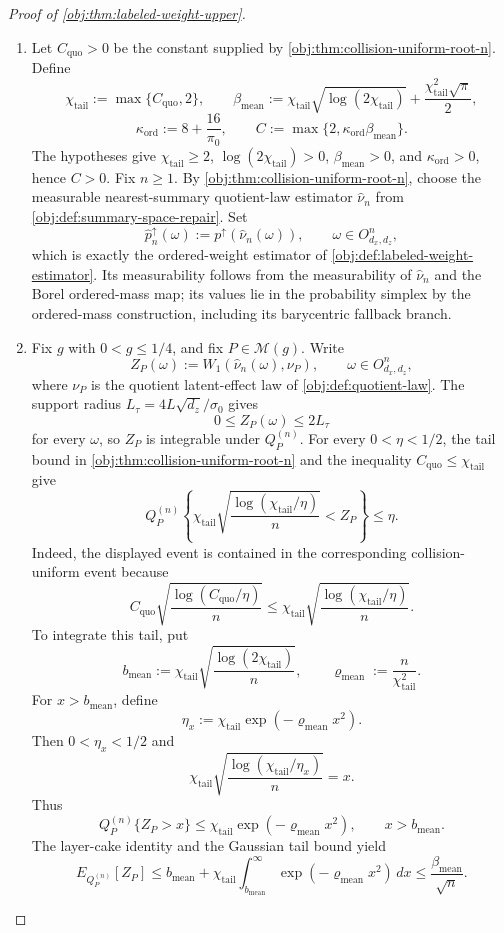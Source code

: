 \documentclass[11pt]{article}
\begin{document}
\begin{proof}[Proof of \cref{obj:thm:labeled-weight-upper}]
\begin{enumerate}
\item
Let \(C_{\mathrm{quo}}>0\) be the constant supplied by \cref{obj:thm:collision-uniform-root-n}.  Define
\[
\chi_{\mathrm{tail}}:=\max\{C_{\mathrm{quo}},2\},\qquad
\beta_{\mathrm{mean}}
:=\chi_{\mathrm{tail}}\sqrt{\log(2\chi_{\mathrm{tail}})}
+\frac{\chi_{\mathrm{tail}}^2\sqrt{\pi}}{2},
\]
\[
\kappa_{\mathrm{ord}}:=8+\frac{16}{\pi_0},
\qquad
C:=\max\{2,\kappa_{\mathrm{ord}}\beta_{\mathrm{mean}}\}.
\]
The hypotheses give \(\chi_{\mathrm{tail}}\ge2\), \(\log(2\chi_{\mathrm{tail}})>0\), \(\beta_{\mathrm{mean}}>0\), and \(\kappa_{\mathrm{ord}}>0\), hence \(C>0\).  Fix \(n\ge1\).  By \cref{obj:thm:collision-uniform-root-n}, choose the measurable nearest-summary quotient-law estimator \(\widehat\nu_n\) from \cref{obj:def:summary-space-repair}.  Set
\[
\widehat p_n^{\uparrow}(\omega):=
p^{\uparrow}\!\left(\widehat\nu_n(\omega)\right),
\qquad \omega\in O_{d_x,d_z}^n ,
\]
which is exactly the ordered-weight estimator of \cref{obj:def:labeled-weight-estimator}.  Its measurability follows from the measurability of \(\widehat\nu_n\) and the Borel ordered-mass map; its values lie in the probability simplex by the ordered-mass construction, including its barycentric fallback branch. %

\item
Fix \(g\) with \(0<g\le1/4\), and fix \(P\in\mathcal M(g)\).  Write
\[
Z_P(\omega):=
W_1\!\left(\widehat\nu_n(\omega),\nu_P\right),
\qquad \omega\in O_{d_x,d_z}^n ,
\]
where \(\nu_P\) is the quotient latent-effect law of \cref{obj:def:quotient-law}.  The support radius \(L_\tau=4L\sqrt{d_z}/\sigma_0\) gives
\[
0\le Z_P(\omega)\le 2L_\tau
\]
for every \(\omega\), so \(Z_P\) is integrable under \(Q_P^{(n)}\).  For every \(0<\eta<1/2\), the tail bound in \cref{obj:thm:collision-uniform-root-n} and the inequality \(C_{\mathrm{quo}}\le\chi_{\mathrm{tail}}\) give
\[
Q_P^{(n)}\!\left\{
\chi_{\mathrm{tail}}\sqrt{\frac{\log(\chi_{\mathrm{tail}}/\eta)}{n}}
< Z_P
\right\}
\le \eta .
\]
Indeed, the displayed event is contained in the corresponding collision-uniform event because
\[
C_{\mathrm{quo}}\sqrt{\frac{\log(C_{\mathrm{quo}}/\eta)}{n}}
\le
\chi_{\mathrm{tail}}\sqrt{\frac{\log(\chi_{\mathrm{tail}}/\eta)}{n}} .
\]
To integrate this tail, put
\[
b_{\mathrm{mean}}:=
\chi_{\mathrm{tail}}\sqrt{\frac{\log(2\chi_{\mathrm{tail}})}{n}},
\qquad
\varrho_{\mathrm{mean}}:=\frac{n}{\chi_{\mathrm{tail}}^2}.
\]
For \(x>b_{\mathrm{mean}}\), define
\[
\eta_x:=\chi_{\mathrm{tail}}\exp(-\varrho_{\mathrm{mean}}x^2).
\]
Then \(0<\eta_x<1/2\) and
\[
\chi_{\mathrm{tail}}\sqrt{\frac{\log(\chi_{\mathrm{tail}}/\eta_x)}{n}}=x.
\]
Thus
\[
Q_P^{(n)}\{Z_P>x\}\le
\chi_{\mathrm{tail}}\exp(-\varrho_{\mathrm{mean}}x^2),
\qquad x>b_{\mathrm{mean}}.
\]
The layer-cake identity and the Gaussian tail bound yield
\[
E_{Q_P^{(n)}}[Z_P]
\le
b_{\mathrm{mean}}
+\chi_{\mathrm{tail}}\int_{b_{\mathrm{mean}}}^{\infty}
\exp(-\varrho_{\mathrm{mean}}x^2)\,dx
\le
\frac{\beta_{\mathrm{mean}}}{\sqrt n}.
\] %


\end{enumerate}
\end{proof}
\end{document}

